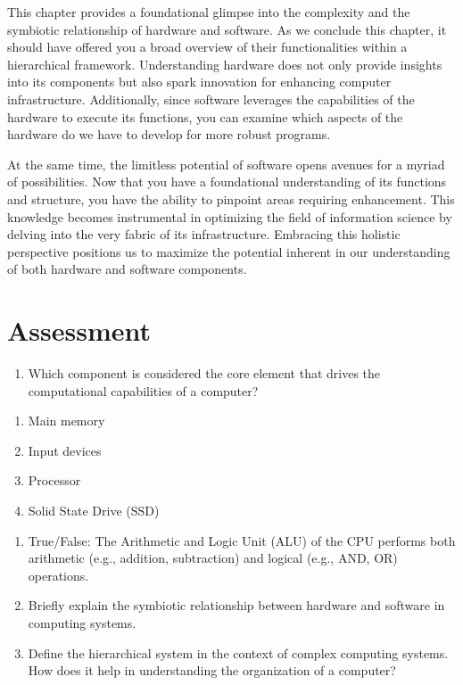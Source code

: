 \documentclass[
  letterpaper,
  DIV=11,
  numbers=noendperiod]{scrreprt}
\providecommand{\tightlist}{%
  \setlength{\itemsep}{0pt}\setlength{\parskip}{0pt}}\usepackage{longtable,booktabs,array}
\begin{document}
This chapter provides a foundational glimpse into the complexity and the
symbiotic relationship of hardware and software. As we conclude this
chapter, it should have offered you a broad overview of their
functionalities within a hierarchical framework. Understanding hardware
does not only provide insights into its components but also spark
innovation for enhancing computer infrastructure. Additionally, since
software leverages the capabilities of the hardware to execute its
functions, you can examine which aspects of the hardware do we have to
develop for more robust programs.

At the same time, the limitless potential of software opens avenues for
a myriad of possibilities. Now that you have a foundational
understanding of its functions and structure, you have the ability to
pinpoint areas requiring enhancement. This knowledge becomes
instrumental in optimizing the field of information science by delving
into the very fabric of its infrastructure. Embracing this holistic
perspective positions us to maximize the potential inherent in our
understanding of both hardware and software components.

\section{Assessment}\label{assessment}

\begin{enumerate}
\def\labelenumi{\arabic{enumi}.}
\tightlist
\item
  Which component is considered the core element that drives the
  computational capabilities of a computer?
\end{enumerate}

\begin{enumerate}
\def\labelenumi{\alph{enumi})}
\tightlist
\item
  Main memory
\item
  Input devices
\item
  Processor
\item
  Solid State Drive (SSD)
\end{enumerate}

\begin{enumerate}
\def\labelenumi{\arabic{enumi}.}
\setcounter{enumi}{1}
\tightlist
\item
  True/False: The Arithmetic and Logic Unit (ALU) of the CPU performs
  both arithmetic (e.g., addition, subtraction) and logical (e.g., AND,
  OR) operations.
\item
  Briefly explain the symbiotic relationship between hardware and
  software in computing systems.
\item
  Define the hierarchical system in the context of complex computing
  systems. How does it help in understanding the organization of a
  computer?
\end{enumerate}
\end{document}
